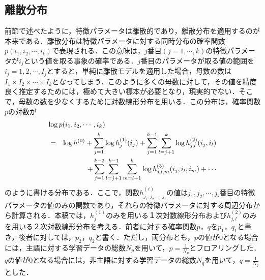 \subsection{離散分布} \label{subsec:離散分布} 
前節で述べたように，特徴パラメータは離散的であり，離散分布を適用するのが本来である．離散分布は特徴パラメータに対する同時分布の確率関数$p(i_{1},i_{2}, \cdots ,i_{k})$で表現される．この意味は，$j$番目$(j=1,\cdots,k)$の特徴パラメータが$i_{j}$という値を取る事象の確率である．$j$番目のパラメータが取る値の範囲を$i_{j}=1,2,\cdots,I_{j}$とすると，単純に離散モデルを適用した場合，母数の数は$I_{1} \times I_{2} \times \cdots \times I_{k}$となってしまう．このように多くの母数に対して，その値を精度良く推定するためには，極めて大きい標本が必要となり，現実的でない．そこで，母数の数を少なくするために対数線形分布を用いる．この分布は，確率関数$p$の対数が
\begin{eqnarray}
 \lefteqn{
  \log{p(i_{1},i_{2}, \cdots ,i_{k})}
 } \nonumber \\
 &=& \log{h^{(0)}}+ \sum_{j=1}^{k} \log{h^{(1)}_{j}(i_{j})}
   +\sum_{j=1}^{k-1} \sum_{l=j+1}^{k} \log{h^{(2)}_{j,l}(i_{j},i_{l})}
   \nonumber \\
 & & +\sum_{j=1}^{k-2} \sum_{l=j+1}^{k-1} \sum_{m=l+1}^{k} 
   \log{h^{(3)}_{j,l,m}(i_{j},i_{l},i_{m})}+ \cdots
\end{eqnarray}
のように書ける分布である．ここで，関数$h^{(i)}_{j_{1},j_{2}, \cdots ,j_{i}}$の値は$j_{1},j_{2}, \cdots ,j_{i}$番目の特徴パラメータの値のみの関数であり，それらの特徴パラメータに対する周辺分布から計算される．本稿では，$h^{(1)}_{j}$のみを用いる１次対数線形分布および$h^{(2)}_{j,l}$のみを用いる２次対数線形分布を考える．前者に対する確率関数$p$，$q$を$p_{1}$，$q_{1}$と書き，後者に対しては，$p_{2}$，$q_{2}$と書く．ただし，両分布とも，$p$の値が$0$となる場合には，主語に対する学習データの総数$N_{p}$を用いて，$ p=\frac{1}{N_{p}} $とフロアリングした．$q$の値が$0$となる場合には，非主語に対する学習データの総数$N_{q}$を用いて，$ q=\frac{1}{N_{q}} $とした．

\newpage
